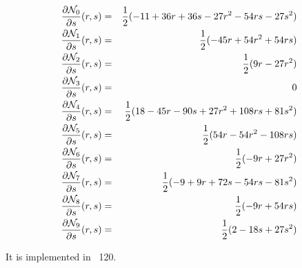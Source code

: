 \begin{eqnarray}
\frac{\partial{\mathcal{N}}_0}{\partial s} (r,s) &=& \frac12(-11+36r+36s-27r^2-54rs-27s^2)   \nonumber\\
\frac{\partial{\mathcal{N}}_1}{\partial s} (r,s) &=& \frac12(-45r+54r^2+54rs)   \nonumber\\
\frac{\partial{\mathcal{N}}_2}{\partial s} (r,s) &=& \frac12(9r-27r^2)   \nonumber\\
\frac{\partial{\mathcal{N}}_3}{\partial s} (r,s) &=& 0   \nonumber\\
\frac{\partial{\mathcal{N}}_4}{\partial s} (r,s) &=& \frac12(18-45r-90s+27r^2+108rs+81s^2)   \nonumber\\
\frac{\partial{\mathcal{N}}_5}{\partial s} (r,s) &=& \frac12(54r-54r^2-108rs)   \nonumber\\
\frac{\partial{\mathcal{N}}_6}{\partial s} (r,s) &=& \frac12(-9r+27r^2)   \nonumber\\
\frac{\partial{\mathcal{N}}_7}{\partial s} (r,s) &=& \frac12(-9+9r+72s-54rs-81s^2)   \nonumber\\
\frac{\partial{\mathcal{N}}_8}{\partial s} (r,s) &=& \frac12(-9r+54rs)   \nonumber\\
\frac{\partial{\mathcal{N}}_9}{\partial s} (r,s) &=& \frac12(2-18s+27s^2)   \nonumber
\end{eqnarray}

It is implemented in \stone~120.


















